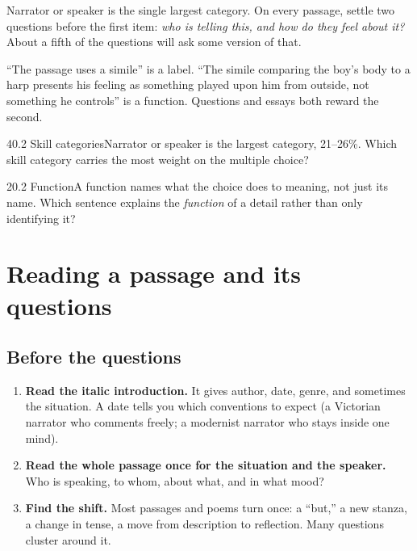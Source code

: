 \documentclass[11pt]{article}
\begin{document}
Narrator or speaker is the single largest category. On every passage, settle two questions before the first item: \emph{who is telling this, and how do they feel about it?} About a fifth of the questions will ask some version of that.

\begin{keyidea}
``The passage uses a simile'' is a label. ``The simile comparing the boy's body to a harp presents his feeling as something played upon him from outside, not something he controls'' is a function. Questions and essays both reward the second.
\end{keyidea}

\begin{q}{4}{0.2 Skill categories}{Narrator or speaker is the largest category, 21--26\%.}
Which skill category carries the most weight on the multiple choice?
\end{q}

\begin{q}{2}{0.2 Function}{A function names what the choice does to meaning, not just its name.}
Which sentence explains the \emph{function} of a detail rather than only identifying it?
\end{q}

\section{Reading a passage and its questions}
\label{sec:3}

\subsection{Before the questions}
\begin{enumerate}[leftmargin=1.6em]
\item \textbf{Read the italic introduction.} It gives author, date, genre, and sometimes the situation. A date tells you which conventions to expect (a Victorian narrator who comments freely; a modernist narrator who stays inside one mind).
\item \textbf{Read the whole passage once for the situation and the speaker.} Who is speaking, to whom, about what, and in what mood?
\item \textbf{Find the shift.} Most passages and poems turn once: a ``but,'' a new stanza, a change in tense, a move from description to reflection. Many questions cluster around it.
\end{enumerate}
\end{document}
